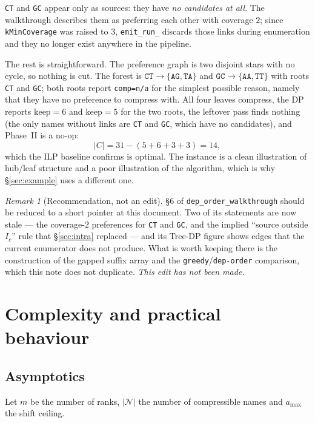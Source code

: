 \documentclass[11pt,a4paper]{article}
\theoremstyle{definition}
\theoremstyle{plain}
\theoremstyle{remark}
\newtheorem{remark}{Remark}
\newcommand{\Names}{\mathcal{N}}
\begin{document}
\texttt{CT} and \texttt{GC} appear only as sources: they have
\emph{no candidates at all}. The walkthrough describes them as
preferring each other with coverage $2$; since \texttt{kMinCoverage} was
raised to $3$, \texttt{emit\_run\_} discards those links during
enumeration and they no longer exist anywhere in the pipeline.

The rest is straightforward. The preference graph is two disjoint stars
with no cycle, so nothing is cut. The forest is
$\mathtt{CT} \to \{\mathtt{AG}, \mathtt{TA}\}$ and
$\mathtt{GC} \to \{\mathtt{AA}, \mathtt{TT}\}$ with roots \texttt{CT}
and \texttt{GC}; both roots report \texttt{comp=n/a} for the simplest
possible reason, namely that they have no preference to compress with.
All four leaves compress, the DP reports $\mathrm{keep} = 6$ and
$\mathrm{keep} = 5$ for the two roots, the leftover pass finds nothing
(the only names without links are \texttt{CT} and \texttt{GC}, which have
no candidates), and Phase~II is a no-op:
\[
  |C| = 31 - (5 + 6 + 3 + 3) = 14,
\]
which the ILP baseline confirms is optimal. The instance is a clean
illustration of hub/leaf structure and a poor illustration of the
algorithm, which is why \S\ref{sec:example} uses a different one.

\begin{remark}[Recommendation, not an edit]
\label{rem:trim}
\S6 of \texttt{dep\_order\_walkthrough} should be reduced to a short
pointer at this document. Two of its statements are now stale --- the
coverage-$2$ preferences for \texttt{CT} and \texttt{GC}, and the
implied ``source outside $I_c$'' rule that
\S\ref{sec:intra} replaced --- and its Tree-DP figure shows edges that
the current enumerator does not produce. What is worth keeping there is
the construction of the gapped suffix array and the
\texttt{greedy}/\texttt{dep-order} comparison, which this note does not
duplicate. \emph{This edit has not been made.}
\end{remark}

\section{Complexity and practical behaviour}
\label{sec:complexity}

\subsection{Asymptotics}

Let $m$ be the number of ranks, $|\Names|$ the number of compressible
names and $a_{\max}$ the shift ceiling.
\end{document}
